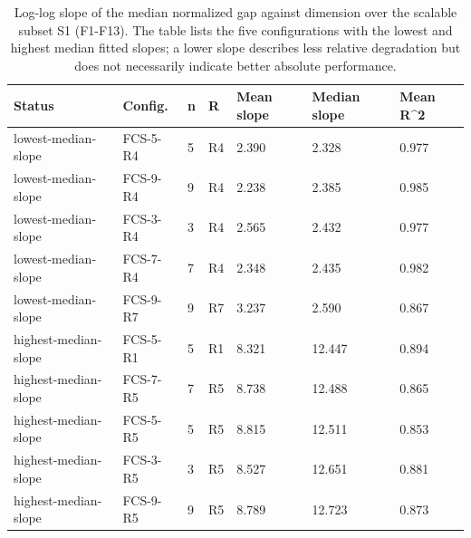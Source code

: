 \begin{table}[h]
\centering
\caption{Log-log slope of the median normalized gap against dimension over the scalable subset S1 (F1-F13). The table lists the five configurations with the lowest and highest median fitted slopes; a lower slope describes less relative degradation but does not necessarily indicate better absolute performance.}
\label{tab:scaling_slopes}
\begin{tabular}{lllllll}
\toprule
Status & Config. & n & R & Mean slope & Median slope & Mean R\textasciicircum{}2 \\
\midrule
lowest-median-slope & FCS-5-R4 & 5 & R4 & 2.390 & 2.328 & 0.977 \\
lowest-median-slope & FCS-9-R4 & 9 & R4 & 2.238 & 2.385 & 0.985 \\
lowest-median-slope & FCS-3-R4 & 3 & R4 & 2.565 & 2.432 & 0.977 \\
lowest-median-slope & FCS-7-R4 & 7 & R4 & 2.348 & 2.435 & 0.982 \\
lowest-median-slope & FCS-9-R7 & 9 & R7 & 3.237 & 2.590 & 0.867 \\
highest-median-slope & FCS-5-R1 & 5 & R1 & 8.321 & 12.447 & 0.894 \\
highest-median-slope & FCS-7-R5 & 7 & R5 & 8.738 & 12.488 & 0.865 \\
highest-median-slope & FCS-5-R5 & 5 & R5 & 8.815 & 12.511 & 0.853 \\
highest-median-slope & FCS-3-R5 & 3 & R5 & 8.527 & 12.651 & 0.881 \\
highest-median-slope & FCS-9-R5 & 9 & R5 & 8.789 & 12.723 & 0.873 \\
\bottomrule
\end{tabular}
\end{table}
